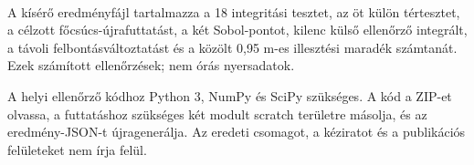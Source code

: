 \documentclass[10pt,a4paper]{article}
\begin{document}
{$$\par
\vspace{2pt}\par\vspace{0.5pt}
\par
A kísérő eredményfájl tartalmazza a 18 integritási tesztet, az öt külön tértesztet, a célzott főcsúcs-újrafuttatást, a két Sobol-pontot, kilenc külső ellenőrző integrált, a távoli felbontásváltoztatást és a közölt 0,95 m-es illesztési maradék számtanát. Ezek számított ellenőrzések; nem órás nyersadatok.
\par
A helyi ellenőrző kódhoz Python 3, NumPy és SciPy szükséges. A kód a ZIP-et olvassa, a futtatáshoz szükséges két modult scratch területre másolja, és az eredmény-JSON-t újragenerálja. Az eredeti csomagot, a kéziratot és a publikációs felületeket nem írja felül.
}
\end{document}
